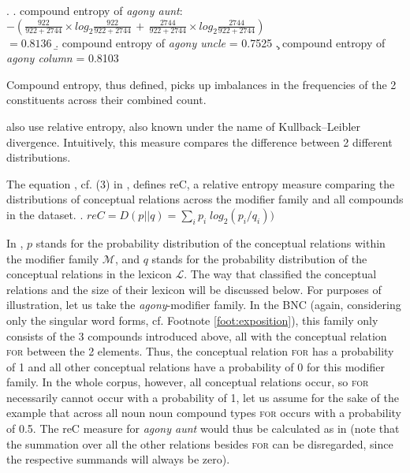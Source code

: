 \ex. 
\a. compound entropy of \emph{agony aunt}:\\
\( \displaystyle - (\frac{922}{922 + 2744} \times log_2 \frac{922}{922 + 2744}\, + \, \frac{2744}{922 + 2744} \times
log_2 \frac{2744}{922 + 2744}) \)
\\[.5em]
\( \displaystyle = 0.8136 \) 
\b. compound entropy of \emph{agony uncle} = 0.7525
\c. compound entropy of \emph{agony column} = 0.8103

Compound entropy, thus defined, picks up imbalances in the
frequencies of the 2 constituents across their combined count.

\citet{PhamandBaayen:2013} also use relative entropy, also known under the name of
Kullback–Leibler divergence. Intuitively, this measure compares the difference between 2 different distributions.

The equation \Next, cf. (3) in 
\citet[459]{PhamandBaayen:2013}, defines reC, a
relative entropy measure comparing the distributions of conceptual
relations across the modifier family and all compounds in the dataset.
\ex. \( \displaystyle reC = D(p||q) = \sum_i p_i \; log_2 (p_i/q_i)) \)

In \Last, $p$ stands for the probability distribution of the conceptual
relations within the modifier family $\mathcal{M}$, and $q$ stands for the
probability distribution of the conceptual relations in the lexicon
$\mathcal{L}$. The way that \citet{PhamandBaayen:2013} classified the
conceptual relations and the size of their lexicon will be discussed
below. For purposes of illustration, let us take the
\emph{agony}-modifier family. In the BNC (again, considering only the singular word forms, cf. Footnote \ref{foot:exposition}), this family only consists
of the 3 compounds introduced above, all with the conceptual relation
\textsc{for} between the 2 elements. Thus, the conceptual relation \textsc{for} has a
probability of 1 and all other conceptual relations have a probability
of 0 for this modifier family. In the whole corpus, however, all
conceptual relations occur, so \textsc{for} necessarily cannot occur with a
probability of 1, let us assume for the sake of the example that
across all noun noun compound types \textsc{for} occurs with a probability of
0.5. The reC measure for \emph{agony aunt} would thus be calculated as
in \Next (note that the summation over all the other relations besides
\textsc{for} can be disregarded, since the respective summands will always be zero). 

